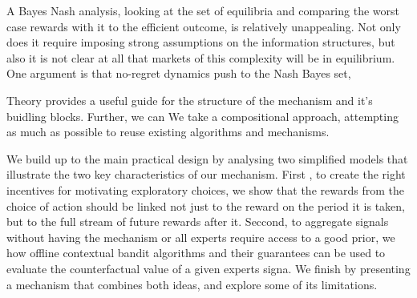 A Bayes Nash analysis, looking at the set of equilibria and comparing the worst case rewards with it to the efficient outcome, is relatively unappealing. 
Not only does it require imposing strong assumptions on the information structures, but also it is not clear at all that markets of this complexity will be in equilibrium.
One argument is that no-regret dynamics push to the Nash Bayes set, 


Theory provides a useful guide for the structure of the mechanism and it's buidling blocks.
Further, we can 
We take a compositional approach, attempting as much as possible to reuse existing algorithms and mechanisms.



We build up to the main practical design by analysing two simplified models that illustrate the two key characteristics of our mechanism. 
First , to create the right incentives for motivating exploratory choices, we show that the rewards from the choice of action should be linked not just to the reward on the period it is taken, but to the full stream of future rewards after it.
Seccond, to aggregate signals without having the mechanism or all  experts require access to a good prior, we how offline contextual bandit algorithms and their guarantees can be used to evaluate the counterfactual value of a given experts signa.
We finish by presenting a mechanism that combines both ideas, and explore some of its limitations.










